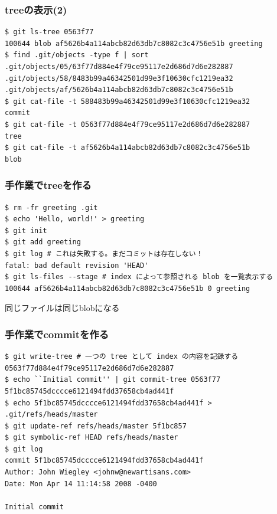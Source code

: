 \begin{frame}[fragile]
  \frametitle{treeの表示(2)}
\begin{lstlisting}
$ git ls-tree 0563f77
100644 blob af5626b4a114abcb82d63db7c8082c3c4756e51b greeting
$ find .git/objects -type f | sort
.git/objects/05/63f77d884e4f79ce95117e2d686d7d6e282887
.git/objects/58/8483b99a46342501d99e3f10630cfc1219ea32
.git/objects/af/5626b4a114abcb82d63db7c8082c3c4756e51b 
$ git cat-file -t 588483b99a46342501d99e3f10630cfc1219ea32
commit
$ git cat-file -t 0563f77d884e4f79ce95117e2d686d7d6e282887
tree
$ git cat-file -t af5626b4a114abcb82d63db7c8082c3c4756e51b
blob
\end{lstlisting}
\end{frame}

\begin{frame}[fragile]
  \frametitle{手作業でtreeを作る}
  \begin{lstlisting}
$ rm -fr greeting .git
$ echo 'Hello, world!' > greeting
$ git init
$ git add greeting
$ git log # これは失敗する。まだコミットは存在しない！
fatal: bad default revision 'HEAD'
$ git ls-files --stage # index によって参照される blob を一覧表示する
100644 af5626b4a114abcb82d63db7c8082c3c4756e51b 0 greeting
  \end{lstlisting}
  \begin{block}{}
    同じファイルは同じblobになる
  \end{block}
\end{frame}

\begin{frame}[fragile]
  \frametitle{手作業でcommitを作る}
  \begin{lstlisting}
$ git write-tree # 一つの tree として index の内容を記録する
0563f77d884e4f79ce95117e2d686d7d6e282887
$ echo ``Initial commit'' | git commit-tree 0563f77
5f1bc85745dcccce6121494fdd37658cb4ad441f
$ echo 5f1bc85745dcccce6121494fdd37658cb4ad441f > .git/refs/heads/master
$ git update-ref refs/heads/master 5f1bc857
$ git symbolic-ref HEAD refs/heads/master
$ git log
commit 5f1bc85745dcccce6121494fdd37658cb4ad441f
Author: John Wiegley <johnw@newartisans.com>
Date: Mon Apr 14 11:14:58 2008 -0400

Initial commit 
  \end{lstlisting}
\end{frame}

